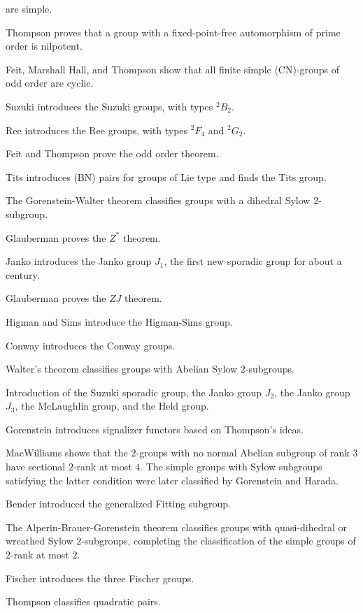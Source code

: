 \documentclass{ximera}
\begin{document}
\begin{description}
  are simple.
\item[1960] Thompson proves that a group with a fixed-point-free
  automorphism of prime order is nilpotent.
\item[1960] Feit, Marshall Hall, and Thompson show that all finite
  simple (CN)-groups of odd order are cyclic.
\item[1960] Suzuki introduces the Suzuki groups, with types $^2B_2$.
\item[1961] Ree introduces the Ree groups, with types $^2F_4$ and
  $^2G_2$.
\item[1963]	Feit and Thompson prove the odd order theorem.
\item[1964] Tits introduces (BN) pairs for groups of Lie type and
  finds the Tits group.
\item[1965] The Gorenstein-Walter theorem classifies groups with a
  dihedral Sylow $2$-subgroup.
\item[1966] Glauberman proves the $Z^*$ theorem.
\item[1966] Janko introduces the Janko group $J_1$, the first new
  sporadic group for about a century.
\item[1968] Glauberman proves the $ZJ$ theorem.
\item[1968] Higman and Sims introduce the Higman-Sims group.
\item[1968] Conway introduces the Conway groups.
\item[1969] Walter's theorem classifies groups with Abelian Sylow
  $2$-subgroups.
\item[1969] Introduction of the Suzuki sporadic group, the Janko group
  $J_2$, the Janko group $J_3$, the McLaughlin group, and the Held
  group.
\item[1969] Gorenstein introduces signalizer functors based on
  Thompson's ideas.
\item[1970] MacWilliams shows that the $2$-groups with no normal
  Abelian subgroup of rank $3$ have sectional $2$-rank at most
  $4$. The simple groups with Sylow subgroups satisfying the latter
  condition were later classified by Gorenstein and Harada.
\item[1970] Bender introduced the generalized Fitting subgroup.
\item[1970] The Alperin-Brauer-Gorenstein theorem classifies groups
  with quasi-dihedral or wreathed Sylow $2$-subgroups, completing the
  classification of the simple groups of $2$-rank at most $2$.
\item[1971] Fischer introduces the three Fischer groups.
\item[1971] Thompson classifies quadratic pairs.

\end{description}
\end{document}
